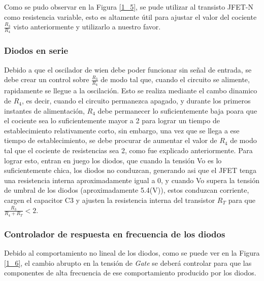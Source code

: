 Como se pudo observar en la Figura \ref{1_5}, se pude utilizar al
transisto JFET-N como resistencia variable, esto es altamente útil
para ajustar el valor del cociente $\frac{R_{3}}{R_{4}}$ visto anteriormente
y utilizarlo a nuestro favor.

\subsubsection{Diodos en serie\label{subsec:Diodos-en-serie}}

Debido a que el oscilador de wien debe poder funcionar sin señal de
entrada, se debe crear un control sobre $\frac{R_{3}}{R_{4}}$ de
modo tal que, cuando el circuito se alimente, rapidamente se llegue
a la oscilación. Esto se realiza mediante el cambo dinamico de $R_{4}$,
es decir, cuando el circuito permanezca apagado, y durante los primeros
instantes de alimentación, $R_{4}$ debe permanecer lo suficientemente
baja poara que el cociente sea lo suficientemente mayor a 2 para lograr
un tiempo de establecimiento relativamente corto, sin embargo, una
vez que se llega a ese tiempo de establecimiento, se debe procurar
de aumentar el valor de $R_{4}$ de modo tal que el cociente de resistencias
sea 2, como fue explicado anteriormente. Para lograr esto, entran
en juego los diodos, que cuando la tensión Vo es lo suficientemente
chica, los diodos no conduzcan, generando asi que el JFET tenga una
resistencia interna aproximadamente igual a 0, y cuando Vo supera
la tensión de umbral de los diodos (aproximadamente 5.4(V)), estos
conduzcan corriente, cargen el capacitor C3 y ajusten la resistencia
interna del transistor $R_{T}$ para que $\frac{R_{3}}{R_{4}+R_{T}}<2$.

\subsubsection{Controlador de respuesta en frecuencia de los diodos}

Debido al comportamiento no lineal de los diodos, como se puede ver
en la Figura \ref{1_6}, el cambio abrupto en la tensión de \emph{Gate}
se deberá controlar para que las componentes de alta frecuencia de
ese comportamiento producido por los diodos.

